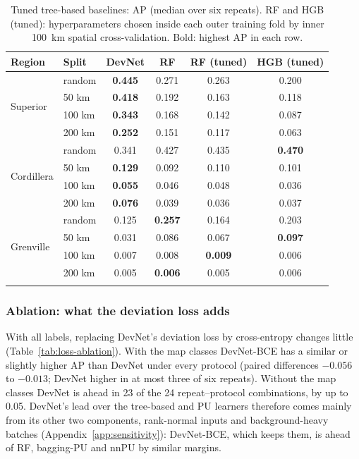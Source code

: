 \documentclass[pdflatex,sn-apa]{sn-jnl}
\begin{document}
\begin{table}[t]
\caption{Tuned tree-based baselines: AP (median over six repeats). RF and HGB (tuned): hyperparameters chosen inside each outer training fold by inner 100~km spatial cross-validation. Bold: highest AP in each row.}\label{tab:controls}
\footnotesize
\setlength{\tabcolsep}{3pt}
\begin{tabular*}{\textwidth}{@{\extracolsep\fill}llcccc}
\toprule
Region & Split & DevNet & RF & RF (tuned) & HGB (tuned) \\
\midrule
\multirow{4}{*}{Superior} & random & \textbf{0.445} & 0.271 & 0.263 & 0.200 \\
 & 50 km & \textbf{0.418} & 0.192 & 0.163 & 0.118 \\
 & 100 km & \textbf{0.343} & 0.168 & 0.142 & 0.087 \\
 & 200 km & \textbf{0.252} & 0.151 & 0.117 & 0.063 \\
\midrule
\multirow{4}{*}{Cordillera} & random & 0.341 & 0.427 & 0.435 & \textbf{0.470} \\
 & 50 km & \textbf{0.129} & 0.092 & 0.110 & 0.101 \\
 & 100 km & \textbf{0.055} & 0.046 & 0.048 & 0.036 \\
 & 200 km & \textbf{0.076} & 0.039 & 0.036 & 0.037 \\
\midrule
\multirow{4}{*}{Grenville} & random & 0.125 & \textbf{0.257} & 0.164 & 0.203 \\
 & 50 km & 0.031 & 0.086 & 0.067 & \textbf{0.097} \\
 & 100 km & 0.007 & 0.008 & \textbf{0.009} & 0.006 \\
 & 200 km & 0.005 & \textbf{0.006} & 0.005 & 0.006 \\
\botrule
\end{tabular*}
\end{table}

\subsubsection{Ablation: what the deviation loss adds}\label{sec:res-ablation}

With all labels, replacing DevNet's deviation loss by cross-entropy changes little (Table~\ref{tab:loss-ablation}). With the map classes DevNet-BCE has a similar or slightly higher AP than DevNet under every protocol (paired differences $-0.056$ to $-0.013$; DevNet higher in at most three of six repeats). Without the map classes DevNet is ahead in 23 of the 24 repeat--protocol combinations, by up to 0.05. DevNet's lead over the tree-based and PU learners therefore comes mainly from its other two components, rank-normal inputs and background-heavy batches (Appendix~\ref{app:sensitivity}): DevNet-BCE, which keeps them, is ahead of RF, bagging-PU and nnPU by similar margins.
\end{document}
